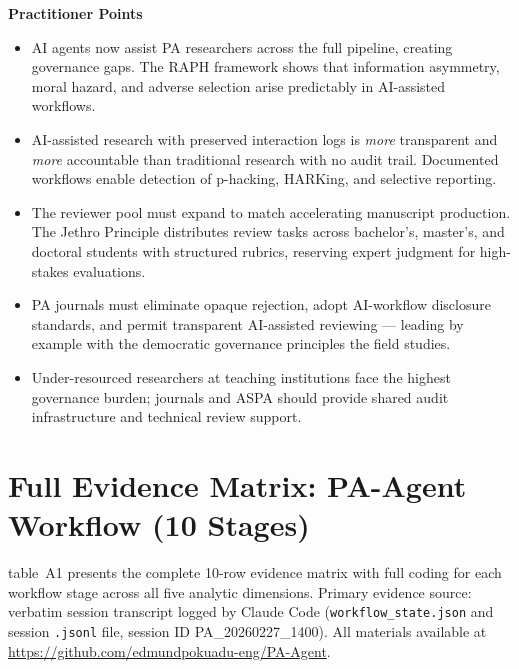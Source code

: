 \documentclass[12pt]{article}
\begin{document}
\bigskip
\noindent\textbf{Practitioner Points}
\begin{itemize}\setlength{\itemsep}{2pt}
  \item AI agents now assist PA researchers across the full pipeline, creating governance
    gaps. The RAPH framework shows that information asymmetry, moral hazard, and adverse
    selection arise predictably in AI-assisted workflows.
  \item AI-assisted research with preserved interaction logs is \emph{more} transparent and
    \emph{more} accountable than traditional research with no audit trail. Documented
    workflows enable detection of p-hacking, HARKing, and selective reporting.
  \item The reviewer pool must expand to match accelerating manuscript production. The
    Jethro Principle distributes review tasks across bachelor's, master's, and doctoral
    students with structured rubrics, reserving expert judgment for high-stakes evaluations.
  \item PA journals must eliminate opaque rejection, adopt AI-workflow disclosure standards,
    and permit transparent AI-assisted reviewing --- leading by example with the democratic
    governance principles the field studies.
  \item Under-resourced researchers at teaching institutions face the highest governance burden; journals
    and ASPA should provide shared audit infrastructure and technical review support.
\end{itemize}

\newpage



\newpage
\appendix
\section{Full Evidence Matrix: PA-Agent Workflow (10 Stages)}
\label{app:matrix}

table~A1 presents the complete 10-row evidence matrix with full coding for each workflow
stage across all five analytic dimensions. Primary evidence source: verbatim session
transcript logged by Claude Code (\texttt{workflow\_state.json} and session \texttt{.jsonl}
file, session ID PA\_20260227\_1400). All materials available at
\url{https://github.com/edmundpokuadu-eng/PA-Agent}.
\end{document}
